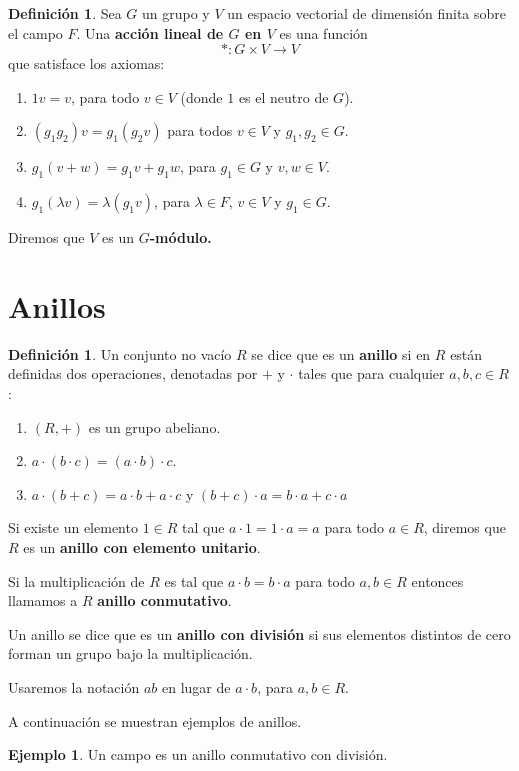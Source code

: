 \documentclass[12pt]{book}
\theoremstyle{definition}
\newtheorem{definition}[theorem]{Definición}
\newtheorem{example}[theorem]{Ejemplo}
\newcounter{in}
\newcounter{ini}
\begin{document}
\begin{definition}
  \label{accion-lineal}
  Sea $G$ un grupo y $V$ un
  espacio vectorial de dimensión
  finita sobre el campo $F$. Una
  \textbf{acción lineal de $G$ en
    $V$} es una función
 $$*:G\times V \rightarrow V $$
que satisface los axiomas:
\begin{enumerate}
\item $1v=v$, para todo $v\in V$ (donde $1$ es el neutro de $G$).
\item $(g_{1}g_{2})v=g_{1}(g_{2}v)$ para todos $v\in V$ y
  $g_{1},g_{2}\in G$.
\item $g_{1}(v+w)=g_{1}v+g_{1}w$, para $g_{1}\in G$ y $v,w \in V .$
\item $g_{1}(\lambda v)=\lambda(g_{1}v)$, para $\lambda \in F$,
  $v\in V$ y $g_{1}\in G.$
\end{enumerate}
Diremos que $V$ es un \textbf{$G$-módulo.}
\end{definition} 

\section{Anillos}
\label{anillos}

\begin{definition}
  Un conjunto no vacío $R$ se dice que es un \textbf{anillo} si en $R$
  están definidas dos operaciones, denotadas por $+$ y $\cdot$ tales
  que para cualquier $a,b,c \in R$:
  \begin{enumerate}
  \item $(R,+)$ es un grupo abeliano.
  \item $a\cdot (b\cdot c)=(a\cdot b)\cdot c$.
  \item $a\cdot (b+c)=a\cdot b+a\cdot c$ y $(b+c)\cdot a=b\cdot a+c\cdot a$
  \end{enumerate}

  Si existe un elemento $1\in R$ tal que $a\cdot 1=1\cdot a=a$ para todo
  $a\in R$, diremos que $R$ es un \textbf{anillo con elemento
    unitario}.
  
  Si la multiplicación de $R$ es tal que $a\cdot b=b\cdot a$ para todo
  $a,b\in R$ entonces llamamos a $R$ \textbf{anillo conmutativo}.

  Un anillo se dice que es un \textbf{anillo con división} si sus
  elementos distintos de cero forman un grupo bajo la multiplicación.

  Usaremos la notación $ab$ en lugar de $a\cdot b$, para $a,b\in R$.
\end{definition}
A continuación se muestran ejemplos de anillos.
\begin{example}
  Un campo es un anillo conmutativo con división.
\end{example}
\end{document}
